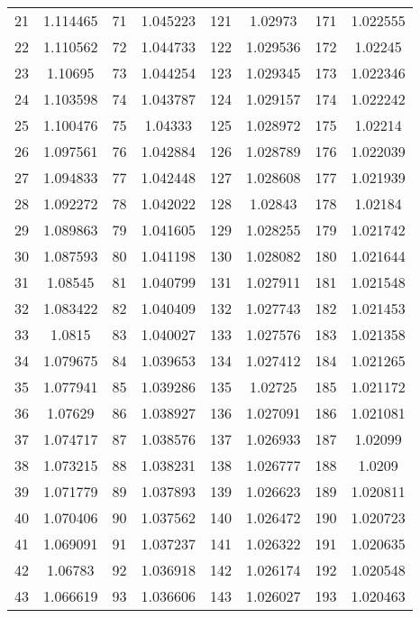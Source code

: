 \documentclass{article}
\begin{document}
\begin{table}
\begin{tabular}{*{8}{c}}
        21 & 1.114465 & 71 & 1.045223 & 121 & 1.02973 & 171 & 1.022555 \\
        22 & 1.110562 & 72 & 1.044733 & 122 & 1.029536 & 172 & 1.02245 \\
        23 & 1.10695 & 73 & 1.044254 & 123 & 1.029345 & 173 & 1.022346 \\
        24 & 1.103598 & 74 & 1.043787 & 124 & 1.029157 & 174 & 1.022242 \\
        25 & 1.100476 & 75 & 1.04333 & 125 & 1.028972 & 175 & 1.02214 \\
        26 & 1.097561 & 76 & 1.042884 & 126 & 1.028789 & 176 & 1.022039 \\
        27 & 1.094833 & 77 & 1.042448 & 127 & 1.028608 & 177 & 1.021939 \\
        28 & 1.092272 & 78 & 1.042022 & 128 & 1.02843 & 178 & 1.02184 \\
        29 & 1.089863 & 79 & 1.041605 & 129 & 1.028255 & 179 & 1.021742 \\
        30 & 1.087593 & 80 & 1.041198 & 130 & 1.028082 & 180 & 1.021644 \\
        31 & 1.08545 & 81 & 1.040799 & 131 & 1.027911 & 181 & 1.021548 \\
        32 & 1.083422 & 82 & 1.040409 & 132 & 1.027743 & 182 & 1.021453 \\
        33 & 1.0815 & 83 & 1.040027 & 133 & 1.027576 & 183 & 1.021358 \\
        34 & 1.079675 & 84 & 1.039653 & 134 & 1.027412 & 184 & 1.021265 \\
        35 & 1.077941 & 85 & 1.039286 & 135 & 1.02725 & 185 & 1.021172 \\
        36 & 1.07629 & 86 & 1.038927 & 136 & 1.027091 & 186 & 1.021081 \\
        37 & 1.074717 & 87 & 1.038576 & 137 & 1.026933 & 187 & 1.02099 \\
        38 & 1.073215 & 88 & 1.038231 & 138 & 1.026777 & 188 & 1.0209 \\
        39 & 1.071779 & 89 & 1.037893 & 139 & 1.026623 & 189 & 1.020811 \\
        40 & 1.070406 & 90 & 1.037562 & 140 & 1.026472 & 190 & 1.020723 \\
        41 & 1.069091 & 91 & 1.037237 & 141 & 1.026322 & 191 & 1.020635 \\
        42 & 1.06783 & 92 & 1.036918 & 142 & 1.026174 & 192 & 1.020548 \\
        43 & 1.066619 & 93 & 1.036606 & 143 & 1.026027 & 193 & 1.020463 \\

\end{tabular}
\end{table}
\end{document}
